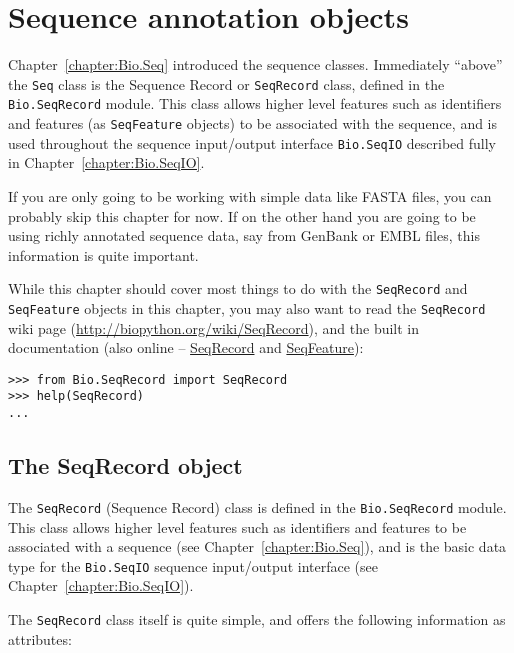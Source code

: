 \chapter{Sequence annotation objects}
\label{chapter:SeqRecord}

Chapter~\ref{chapter:Bio.Seq} introduced the sequence classes.  Immediately ``above'' the \verb|Seq| class is the Sequence Record or \verb|SeqRecord| class, defined in the \verb|Bio.SeqRecord| module. This class allows higher level features such as identifiers and features (as \verb|SeqFeature| objects) to be associated with the sequence, and is used throughout the sequence input/output interface \verb|Bio.SeqIO| described fully in Chapter~\ref{chapter:Bio.SeqIO}.

If you are only going to be working with simple data like FASTA files, you can probably skip this chapter
for now. If on the other hand you are going to be using richly annotated sequence data, say from GenBank
or EMBL files, this information is quite important.

While this chapter should cover most things to do with the \verb|SeqRecord| and \verb|SeqFeature| objects in this chapter, you may also want to read the \verb|SeqRecord| wiki page (\url{http://biopython.org/wiki/SeqRecord}), and the built in documentation (also online -- \href{http://biopython.org/DIST/docs/api/Bio.SeqRecord.SeqRecord-class.html}{SeqRecord} and \href{http://biopython.org/DIST/docs/api/Bio.SeqFeature.SeqFeature-class.html}{SeqFeature}):

\begin{verbatim}
>>> from Bio.SeqRecord import SeqRecord
>>> help(SeqRecord)
...
\end{verbatim}

\section{The SeqRecord object}
\label{sec:SeqRecord}

The \verb|SeqRecord| (Sequence Record) class is defined in the \verb|Bio.SeqRecord| module. This class allows higher level features such as identifiers and features to be associated with a sequence (see Chapter~\ref{chapter:Bio.Seq}), and is the basic data type for the \verb|Bio.SeqIO| sequence input/output interface (see Chapter~\ref{chapter:Bio.SeqIO}).

The \verb|SeqRecord| class itself is quite simple, and offers the following information as attributes:

